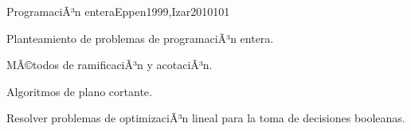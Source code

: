 \begin{syllabus}
\begin{unit}{ProgramaciÃ³n entera}{Eppen1999,Izar2010}{10}{1}
   \begin{topics}
      \item Planteamiento de problemas de programaciÃ³n entera.
      \item MÃ©todos de ramificaciÃ³n y acotaciÃ³n.
      \item Algoritmos de plano cortante.
   \end{topics}

   \begin{unitgoals}
      \item Resolver problemas de optimizaciÃ³n lineal para la toma de decisiones booleanas.
   \end{unitgoals}
\end{unit}



\begin{coursebibliography}
\end{coursebibliography}

\end{syllabus}
